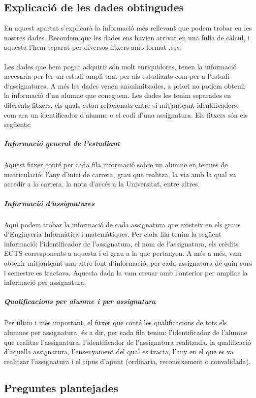 \documentclass[12pt,a4paper,catalan]{article}
\begin{document}
\subsection{Explicació de les dades obtingudes} 
En aquest apartat s'explicarà la informació més rellevant que podem trobar en les nostres dades. Recordem que les dades ens havien arrivat en una fulla de càlcul, i aquesta l'hem separat per diversos fitxers amb format .csv.
\\
\\
Les dades que hem pogut adquirir són molt enriquidores, tenen la informació necesaria per fer un estudi ampli tant per als estudiants com per a l'estudi d'assignatures. A més les dades venen anonimitzades, a priori no podem obtenir la informació d'un alumne que coneguem. Les dades les tenim separades en diferents fitxers, els quals estan relacionats entre si mitjantçant identificadors, com ara un identificador d'alumne o el codi d'una assignatura. Els fitxers són els següents:

\subparagraph{Informació general de l'estudiant}
Aquest fitxer conté per cada fila informació sobre un alumne en termes de matriculació: l'any d'inici de carrera, grau que realitza, la via amb la qual va accedir a la carrera, la nota d'accés a la Universitat, entre altres.

\subparagraph{Informació d'assignatures}
Aquí podem trobar la informació de cada assignatura que existeix en els graus d'Enginyeria Informàtica i matemàtiques. Per cada fila tenim la següent informació: l'identificador de l'assignatura, el nom de l'assignatura, els crèdits ECTS corresponents a aquesta i el grau a la que pertanyen. A més a més, vam obtenir mitjantçant una altre font d'informació, per cada assignatura de quin curs i semestre es tractava. Aquesta dada la vam creuar amb l'anterior per ampliar la informació per assignatura.

\subparagraph{Qualificacions per alumne i per assignatura}
Per últim i més important, el fitxer que conté les qualificacions de tots els alumnes per assignatura, és a dir, per cada fila tenim: l'identificador de l'alumne que realitze l'assignatura, l'identificador de l'assignatura realitzada, la qualificació d'aquella assignatura, l'ensenyament del qual es tracta, l'any en el que es va realitzar l'assignatura i el tipus d'apunt (ordinaria, reconeixement o convalidada).

\newpage

\subsection{Preguntes plantejades}
\end{document}
